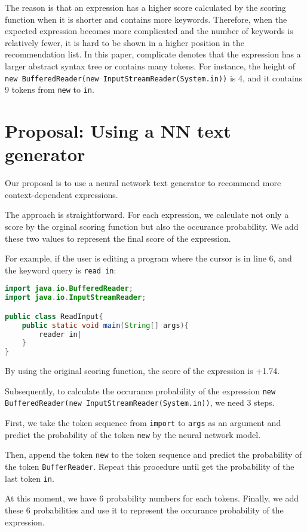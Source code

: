 \documentclass[PRO,english]{ipsj}
\begin{document}
The reason is that an expression has a higher score calculated by the scoring function when it is shorter and contains more keywords. Therefore, when the expected expression becomes more complicated and the number of keywords is relatively fewer, it is hard to be shown in a higher position in the recommendation list. In this paper, complicate denotes that the expression has a larger abstract syntax tree or contains many tokens. For instance, the height of \texttt{new BufferedReader(new InputStreamReader(System.in))} is 4, and it contains 9 tokens from \texttt{new} to \texttt{in}.

\section{Proposal: Using a NN text generator}
Our proposal is to use a neural network text generator to recommend more context-dependent expressions.

The approach is straightforward. For each expression, we calculate not only a score by the orginal scoring function but also the occurance probability. We add these two values to represent the final score of the expression.

For example, if the user is editing a program where the cursor is in line 6, and the keyword query is \texttt{read in}:
\begin{lstlisting}[language=Java]
import java.io.BufferedReader;
import java.io.InputStreamReader;

public class ReadInput{
    public static void main(String[] args){
        reader in|
    }
}
\end{lstlisting}

By using the original scoring function, the score of the expression is +1.74. 

Subsequently, to calculate the occurance probability of the expression \texttt{new BufferedReader(new InputStreamReader(System.in))}, we need 3 steps. 

First, we take the token sequence from \texttt{import} to \texttt{args} as an argument and predict the probability of the token \texttt{new} by the neural network model. 

Then, append the token \texttt{new} to the token sequence and predict the probability of the token \texttt{BufferReader}. Repeat this procedure until get the probability of the last token \texttt{in}. 

At this moment, we have 6 probability numbers for each tokens.  Finally, we add these 6 probabilities and use it to represent the occurance probability of the expression.
\end{document}
